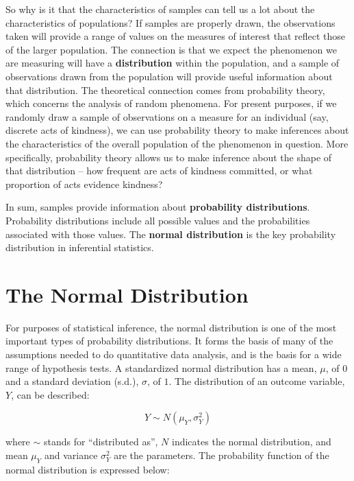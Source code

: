 \documentclass[11pt,openany]{book}\usepackage[]{graphicx}\usepackage[]{color}
\begin{document}
{So why is it that the characteristics of samples can tell us a lot about the characteristics of populations? If samples are properly drawn, the observations taken will provide a range of values on the measures of interest that reflect those of the larger population. The connection is that we expect the phenomenon we are measuring will have a \textbf{distribution} within the population, and a sample of observations drawn from the population will provide useful information about that distribution. The theoretical connection comes from probability theory, which concerns the analysis of random phenomena. For present purposes, if we randomly draw a sample of observations on a measure for an individual (say, discrete acts of kindness), we can use probability theory to make inferences about the characteristics of the overall population of the phenomenon in question. More specifically, probability theory allows us to make inference about the shape of that distribution -- how frequent are acts of kindness committed, or what proportion of acts evidence kindness?

In sum, samples provide information about  \textbf{probability distributions}. Probability distributions include all possible values and the probabilities associated with those values. The \textbf{normal distribution} is the key probability distribution in inferential statistics.

\section{The Normal Distribution} 

For purposes of statistical inference, the normal distribution is one of the most important types of probability distributions. It forms the basis of many of the assumptions needed to do quantitative data analysis, and is the basis for a wide range of hypothesis tests.  A standardized normal distribution has a mean, $\mu$, of $0$ and a standard deviation (s.d.), $\sigma$, of $1$. The distribution of an outcome variable, $Y$, can be
described: 

\begin{equation}
  \label{eq:norm}
  Y \sim N(\mu_Y,\sigma^{2}_Y)
\end{equation}

\noindent where $\sim$ stands for ``distributed as'', $N$ indicates the normal distribution, and mean $\mu_Y$ and variance $\sigma^{2}_Y$ are
the parameters. The probability function of the normal distribution is expressed below:

}
\end{document}
